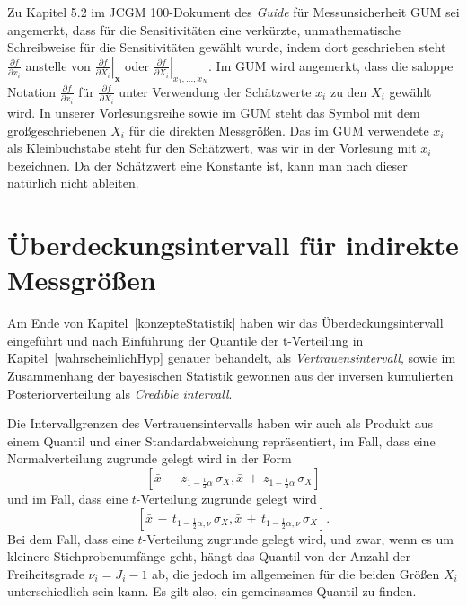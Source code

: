 Zu Kapitel 5.2 im JCGM 100-Dokument des \textsl{Guide} für Messunsicherheit GUM
sei angemerkt, dass für die Sensitivitäten eine verkürzte, unmathematische Schreibweise
für die Sensitivitäten gewählt wurde, indem dort geschrieben steht $\frac{\partial f}{\partial x_i}$
anstelle von $\left. \frac{\partial f}{\partial X_i} \right|_{\bar{\mathbf{x}}}$ oder
$\left. \frac{\partial f}{\partial X_i} \right|_{\bar x_1, \dots, \bar x_N}$.
Im GUM wird angemerkt, dass die saloppe Notation $\frac{\partial f}{\partial x_i}$ für
$\frac{\partial f}{\partial X_i}$
unter Verwendung der Schätzwerte $x_i$ zu den $X_i$ gewählt wird.
In unserer Vorlesungsreihe sowie im GUM steht das Symbol mit dem großgeschriebenen $X_i$ für die
direkten Messgrößen. Das im GUM verwendete $x_i$ als Kleinbuchstabe steht für den Schätzwert,
was wir in der Vorlesung mit $\bar x_i$ bezeichnen. Da der Schätzwert eine Konstante ist,
kann man nach dieser natürlich nicht ableiten.


\section{Überdeckungsintervall für indirekte Messgrößen}

Am Ende von Kapitel~\ref{konzepteStatistik} haben wir das Überdeckungsintervall eingeführt
und nach Einführung der Quantile der t-Verteilung in Kapitel~\ref{wahrscheinlichHyp} genauer
behandelt, als \textsl{Vertrauensintervall}, sowie im Zusammenhang der bayesischen Statistik
gewonnen aus der inversen kumulierten Posteriorverteilung als \textsl{Credible intervall}.

Die Intervallgrenzen des Vertrauensintervalls haben wir
auch als Produkt aus einem Quantil und einer Standardabweichung repräsentiert, im Fall, dass
eine Normalverteilung zugrunde gelegt wird in der Form
\begin{equation}
\left[\bar x \, - \, z_{1-\frac{1}{2}\alpha} \, \sigma_X,
\bar x \, + \, z_{1-\frac{1}{2}\alpha} \, \sigma_X \right]
\end{equation}
und im Fall, dass eine $t$-Verteilung zugrunde gelegt wird
\begin{equation}
\left[\bar x \, - \, t_{1-\frac{1}{2}\alpha, \nu} \, \sigma_X,
\bar x \, + \, t_{1-\frac{1}{2}\alpha, \nu} \, \sigma_X \right] .
\end{equation}
Bei dem Fall, dass eine $t$-Verteilung zugrunde gelegt wird, und zwar, wenn es um kleinere
Stichprobenumfänge geht, hängt das Quantil von der Anzahl der Freiheitsgrade $\nu_i = J_i - 1$
ab, die jedoch im allgemeinen für die beiden Größen $X_i$
unterschiedlich sein kann. Es gilt also, ein gemeinsames Quantil zu finden.

